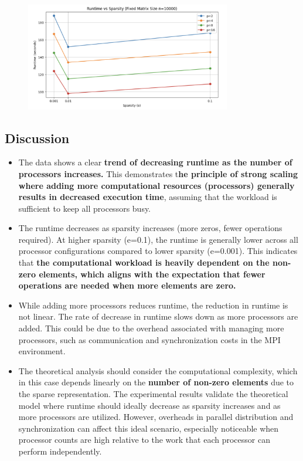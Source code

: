 \documentclass{article}
\begin{document}
\begin{figure}[H]
    \centering
    \includegraphics[width=0.8\textwidth]{Photos/runtime2.png}
    \label{fig:runtime}
\end{figure}

\subsection{Discussion}
\begin{itemize}
    \item The data shows a clear \textbf{trend of decreasing runtime as the number of processors increases.} This demonstrates t\textbf{he principle of strong scaling where adding more computational resources (processors) generally results in decreased execution time}, assuming that the workload is sufficient to keep all processors busy.
    \item The runtime decreases as sparsity increases (more zeros, fewer operations required). At higher sparsity (e=0.1), the runtime is generally lower across all processor configurations compared to lower sparsity (e=0.001). This indicates that \textbf{the computational workload is heavily dependent on the non-zero elements, which aligns with the expectation that fewer operations are needed when more elements are zero.}
    \item While adding more processors reduces runtime, the reduction in runtime is not linear. The rate of decrease in runtime slows down as more processors are added. This could be due to the overhead associated with managing more processors, such as communication and synchronization costs in the MPI environment.
    \item The theoretical analysis should consider the computational complexity, which in this case depends linearly on the \textbf{number of non-zero elements }due to the sparse representation. The experimental results validate the theoretical model where runtime should ideally decrease as sparsity increases and as more processors are utilized. However, overheads in parallel distribution and synchronization can affect this ideal scenario, especially noticeable when processor counts are high relative to the work that each processor can perform independently.

\end{itemize}
\end{document}
